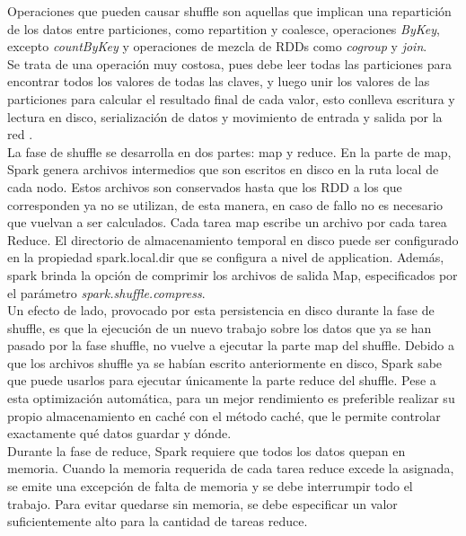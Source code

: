 Operaciones que pueden causar shuffle son aquellas que implican una repartición de los datos entre particiones, como repartition y coalesce, operaciones \textit{ByKey}, excepto  \textit{countByKey} y operaciones de mezcla de RDDs como \textit{cogroup} y \textit{join}.\\

Se trata de una operación muy costosa, pues debe leer todas las particiones para encontrar todos los valores de todas las claves, y luego unir los valores de las particiones para calcular el resultado final de cada valor, esto conlleva escritura y lectura en disco, serialización de datos y movimiento de entrada y salida por la red \cite{6RDD_Documentation}.\\

La fase de shuffle se desarrolla en dos partes: map y reduce. En la parte de map, Spark genera archivos intermedios que son escritos en disco en la ruta local de cada nodo. Estos archivos son conservados hasta que los RDD a los que corresponden ya no se utilizan, de esta manera, en caso de fallo no es necesario que vuelvan a ser calculados. Cada tarea map escribe un archivo por cada tarea Reduce. El directorio de almacenamiento temporal en disco puede ser configurado en la propiedad spark.local.dir que se configura a nivel de application. Además, spark brinda la opción de comprimir los archivos de salida Map, especificados por el parámetro \textit{spark.shuffle.compress}.\\

Un efecto de lado, provocado por esta persistencia en disco durante la fase de shuffle, es que la ejecución de un nuevo trabajo sobre los datos que ya se han pasado por la fase shuffle, no vuelve a ejecutar la parte map del shuffle. Debido a que los archivos shuffle ya se habían escrito anteriormente en disco, Spark sabe que puede usarlos para ejecutar únicamente la parte reduce del shuffle. Pese a esta optimización automática,  para un mejor rendimiento es preferible realizar su propio almacenamiento en caché con el método caché, que le permite controlar exactamente qué datos guardar y dónde.\\

Durante la fase de reduce, Spark requiere que todos los datos quepan en memoria. Cuando la memoria requerida de cada tarea reduce excede la asignada, se emite una excepción de falta de memoria y se debe interrumpir todo el trabajo. Para evitar quedarse sin memoria, se debe especificar un valor suficientemente alto para la cantidad de tareas reduce.\\


